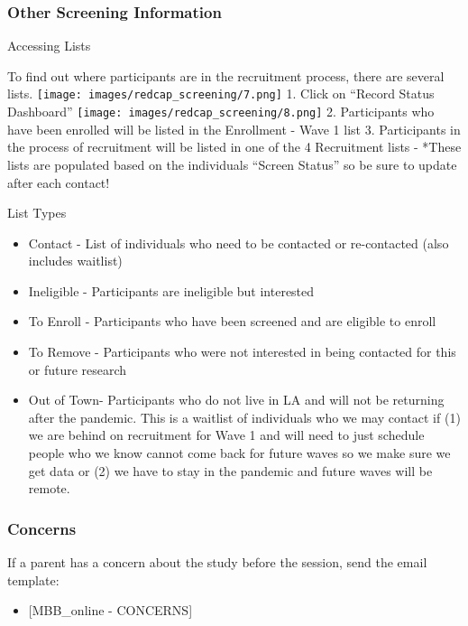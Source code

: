 \documentclass[
]{book}
\providecommand{\tightlist}{%
  \setlength{\itemsep}{0pt}\setlength{\parskip}{0pt}}
\begin{document}
\hypertarget{other-screening-information-1}{%
\subsubsection{Other Screening Information}\label{other-screening-information-1}}

Accessing Lists

To find out where participants are in the recruitment process, there are several lists.
\texttt{[image: images/redcap\_screening/7.png]}
1. Click on ``Record Status Dashboard''
\texttt{[image: images/redcap\_screening/8.png]}
2. Participants who have been enrolled will be listed in the Enrollment - Wave 1 list
3. Participants in the process of recruitment will be listed in one of the 4 Recruitment lists
- *These lists are populated based on the individuals ``Screen Status'' so be sure to update after each contact!

List Types

\begin{itemize}
\tightlist
\item
  Contact - List of individuals who need to be contacted or re-contacted (also includes waitlist)
\item
  Ineligible - Participants are ineligible but interested
\item
  To Enroll - Participants who have been screened and are eligible to enroll
\item
  To Remove - Participants who were not interested in being contacted for this or future research
\item
  Out of Town- Participants who do not live in LA and will not be returning after the pandemic. This is a waitlist of individuals who we may contact if (1) we are behind on recruitment for Wave 1 and will need to just schedule people who we know cannot come back for future waves so we make sure we get data or (2) we have to stay in the pandemic and future waves will be remote.
\end{itemize}

\hypertarget{concerns}{%
\subsubsection{Concerns}\label{concerns}}

If a parent has a concern about the study before the session, send the email template:

\begin{itemize}
\tightlist
\item
  {[}MBB\_online - CONCERNS{]}
\end{itemize}
\end{document}
